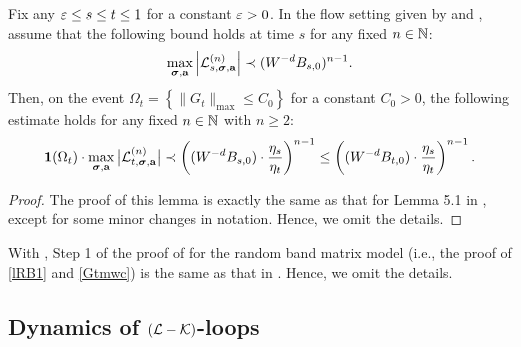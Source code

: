 \begin{lemma}\label{lem_ConArg}
Fix any \(\e \le s \leq t \leq 1\) for a constant \(\e > 0\). In the flow setting given by  and , assume that the following bound holds at time \(s\) for any fixed $n\in \N$: 
\begin{equation}\label{eq:loopbound_s}
    \max_{\bsig, {\ba}} \abs{{\cal L}^{(n)}_{s, \bsig, {\ba}}} \prec(W^{-d}B_{s,0})^{n-1}.
\end{equation}
Then, on the event \(\Omega_t= \left\{\|G_{t}\|_{\max} \leq C_0\right\}\) for a constant $C_0>0$, the following estimate holds for any fixed \(n \in \N\) with $n\ge 2$:
\begin{equation}\label{res_lo_bo_eta}
    {\bf 1}(\Omega_t) \cdot \max_{\bsig, {\ba}} \big|{\cal L}^{(n)}_{t, \bsig, {\ba}} \big|\prec \left(
    (W^{-d}B_{s,0})\cdot\frac{\eta_{s}}{\eta_{t}}\right)^{n-1}
    \le  \left(
    (W^{-d}B_{t,0})\cdot\frac{\eta_{s}}{\eta_{t}}\right)^{n-1}.
\end{equation}
\end{lemma} 
\begin{proof}%
The proof of this lemma is exactly the same as that for Lemma 5.1 in \cite{YY_25}, except for some minor changes in notation. Hence, we omit the details.\end{proof}


With , Step 1 of the proof of  for the random band matrix model (i.e., the proof of \eqref{lRB1} and \eqref{Gtmwc}) is the same as that in \cite[Section 5.1]{YY_25}. Hence, we omit the details. 


\subsection{Dynamics of  \texorpdfstring{$(\cal L-\cal K)$-loops}{L-K}}\label{subsec:DyLK}

